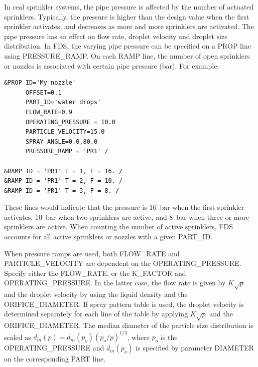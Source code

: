 \documentclass[11pt]{book}
\begin{document}
In real sprinkler systems, the pipe pressure is affected by the number of actuated sprinklers. Typically, the pressure is higher than the design value when the first sprinkler activates, and decreases as more and more sprinklers are activated. The pipe pressure has an effect on flow rate, droplet velocity and droplet size distribution. In FDS, the varying pipe pressure can be specified on a {\ct PROP} line using {\ct PRESSURE\_RAMP}. On each {\ct RAMP} line, the number of open sprinklers or nozzles is associated with certain pipe pressure (bar). For example:
\begin{lstlisting}
&PROP ID='My nozzle'
      OFFSET=0.1
      PART_ID='water drops'
      FLOW_RATE=0.9
      OPERATING_PRESSURE = 10.0
      PARTICLE_VELOCITY=15.0
      SPRAY_ANGLE=0.0,80.0
      PRESSURE_RAMP = 'PR1' /

&RAMP ID = 'PR1' T = 1, F = 16. /
&RAMP ID = 'PR1' T = 2, F = 10. /
&RAMP ID = 'PR1' T = 3, F = 8. /
\end{lstlisting}
These lines would indicate that the pressure is 16~bar when the first sprinkler activates, 10~bar when two sprinklers are active, and 8~bar when three or more sprinklers are active. When counting the number of active sprinklers, FDS accounts for all active sprinklers or nozzles with a given {\ct PART\_ID}.

When pressure ramps are used, both {\ct FLOW\_RATE} and {\ct PARTICLE\_VELOCITY} are dependent on the {\ct OPERATING\_PRESSURE}. Specify either the {\ct FLOW\_RATE}, or the {\ct K\_FACTOR} and {\ct OPERATING\_PRESSURE}. In the latter case, the flow rate is given by $K \sqrt{p}$ and the droplet velocity by using the liquid density and the {\ct ORIFICE\_DIAMETER}.  If spray pattern table is used, the droplet velocity is determined separately for each line of the table by applying $K\sqrt{p}$ and the {\ct ORIFICE\_DIAMETER}. The median diameter of the particle size distribution is scaled as $d_m(p) = d_m(p_o)(p_o/p)^{1/3}$, where $p_o$ is the {\ct OPERATING\_PRESSURE} and $d_m(p_o)$ is specified by parameter {\ct DIAMETER} on the corresponding {\ct PART} line.
\end{document}
